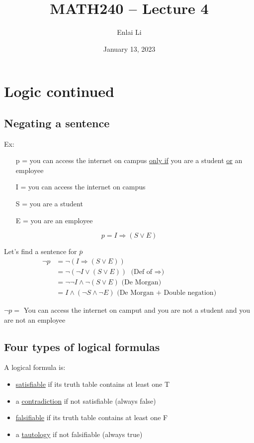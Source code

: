 \documentclass{article}
\author{Enlai Li}
\title{MATH240 -- Lecture 4}
\date{January 13, 2023}
\begin{document}
\maketitle
\section{Logic continued}
\subsection{Negating a sentence}
Ex:
\begin{itemize}
    \item [p =] you can access the internet on campus \underline{only if} you are a student \underline{or} an employee
    \item [I =] you can access the internet on campus
    \item [S =] you are a student
    \item [E =] you are an employee
\end{itemize}
\[
    p = I \Rightarrow (S \lor E)
\]

Let's find a sentence for $\overline{p}$
\begin{align*}
    \lnot p
     & = \lnot (I \Rightarrow (S \lor E))
    \\ & = \lnot (\lnot I \lor (S \lor E)) \text{ (Def of $\Rightarrow $)}
    \\ & = \lnot \lnot I \land \lnot(S \lor E) \text{ (De Morgan)}
    \\ & =  I \land (\lnot S \land \lnot E) \text{ (De Morgan + Double negation)}
\end{align*}

$ \lnot p =$ You can access the internet on camput and you are not a student and you are not an employee

\subsection{Four types of logical formulas}
A logical formula is:
\begin{itemize}
    \item \underline{satisfiable} if its truth table contains at least one T
    \item a \underline{contradiction} if not satisfiable (always false)
    \item \underline{falsifiable} if its truth table contains at least one F
    \item a \underline{tautology} if not falsifiable (always true)
\end{itemize}
\clearpage
\end{document}
